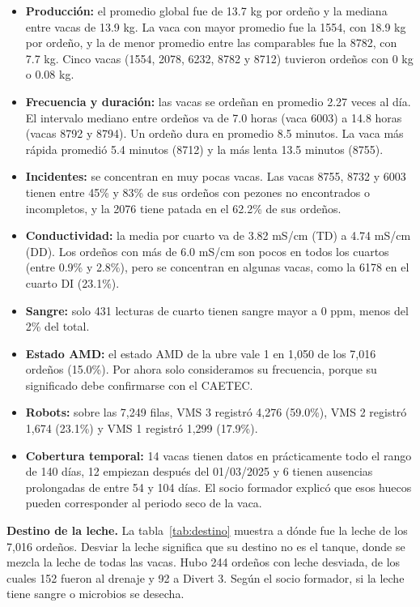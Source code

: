 \begin{itemize}
  \item \textbf{Producción:} el promedio global fue de 13.7 kg por ordeño y la mediana entre vacas de 13.9 kg. La vaca con mayor promedio fue la 1554, con 18.9 kg por ordeño, y la de menor promedio entre las comparables fue la 8782, con 7.7 kg. Cinco vacas (1554, 2078, 6232, 8782 y 8712) tuvieron ordeños con 0 kg o 0.08 kg.
  \item \textbf{Frecuencia y duración:} las vacas se ordeñan en promedio 2.27 veces al día. El intervalo mediano entre ordeños va de 7.0 horas (vaca 6003) a 14.8 horas (vacas 8792 y 8794). Un ordeño dura en promedio 8.5 minutos. La vaca más rápida promedió 5.4 minutos (8712) y la más lenta 13.5 minutos (8755).
  \item \textbf{Incidentes:} se concentran en muy pocas vacas. Las vacas 8755, 8732 y 6003 tienen entre 45\% y 83\% de sus ordeños con pezones no encontrados o incompletos, y la 2076 tiene patada en el 62.2\% de sus ordeños.
  \item \textbf{Conductividad:} la media por cuarto va de 3.82 mS/cm (TD) a 4.74 mS/cm (DD). Los ordeños con más de 6.0 mS/cm son pocos en todos los cuartos (entre 0.9\% y 2.8\%), pero se concentran en algunas vacas, como la 6178 en el cuarto DI (23.1\%).
  \item \textbf{Sangre:} solo 431 lecturas de cuarto tienen sangre mayor a 0 ppm, menos del 2\% del total.
  \item \textbf{Estado AMD:} el estado AMD de la ubre vale 1 en 1,050 de los 7,016 ordeños (15.0\%). Por ahora solo consideramos su frecuencia, porque su significado debe confirmarse con el CAETEC.
  \item \textbf{Robots:} sobre las 7,249 filas, VMS 3 registró 4,276 (59.0\%), VMS 2 registró 1,674 (23.1\%) y VMS 1 registró 1,299 (17.9\%).
  \item \textbf{Cobertura temporal:} 14 vacas tienen datos en prácticamente todo el rango de 140 días, 12 empiezan después del 01/03/2025 y 6 tienen ausencias prolongadas de entre 54 y 104 días. El socio formador explicó que esos huecos pueden corresponder al periodo seco de la vaca.
\end{itemize}

\textbf{Destino de la leche.} La tabla~\ref{tab:destino} muestra a dónde fue la leche de los 7,016 ordeños. Desviar la leche significa que su destino no es el tanque, donde se mezcla la leche de todas las vacas. Hubo 244 ordeños con leche desviada, de los cuales 152 fueron al drenaje y 92 a Divert 3. Según el socio formador, si la leche tiene sangre o microbios se desecha.

